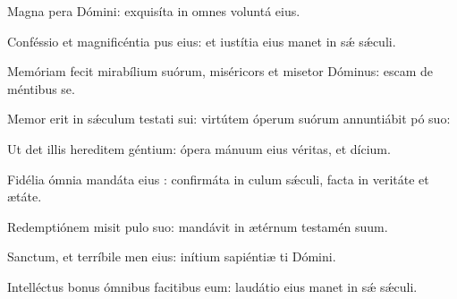 \item {}

\item Magna pera Dómini:\psstar{} exquisíta in omnes voluntá eius.

\item Conféssio et magnificéntia pus eius:\psstar{} et iustítia eius manet in sǽ sǽculi.

\item Memóriam fecit mirabílium suórum,\pscross{} miséricors et misetor Dóminus:\psstar{} escam de méntibus se.

\item Memor erit in sǽculum testati sui:\psstar{} virtútem óperum suórum annuntiábit pó suo:

\item Ut det illis hereditem géntium:\psstar{} ópera mánuum eius véritas, et dícium.

\item Fidélia ómnia mandáta eius :\pscross{} confirmáta in culum sǽculi,\psstar{} facta in veritáte et ætáte.

\item Redemptiónem misit pulo suo:\psstar{} mandávit in ætérnum testamén suum.

\item Sanctum, et terríbile men eius:\psstar{} inítium sapiéntiæ ti Dómini.

\item Intelléctus bonus ómnibus facitibus eum:\psstar{} laudátio eius manet in sǽ sǽculi.